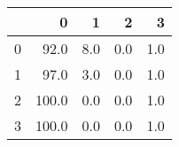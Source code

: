 \begin{tabular}{lrrrr}
\toprule
{} &      0 &    1 &    2 &    3 \\
\midrule
0 &   92.0 &  8.0 &  0.0 &  1.0 \\
1 &   97.0 &  3.0 &  0.0 &  1.0 \\
2 &  100.0 &  0.0 &  0.0 &  1.0 \\
3 &  100.0 &  0.0 &  0.0 &  1.0 \\
\bottomrule
\end{tabular}
